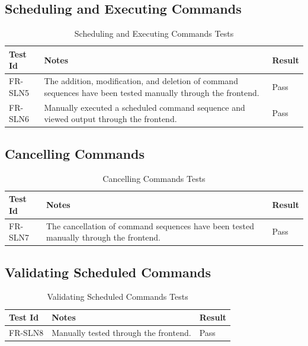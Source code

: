 \documentclass[12pt, titlepage]{article}
\begin{document}
\subsection{Scheduling and Executing Commands}

\begin{center}
\begin{longtable}{|p{2cm} | p{8cm} |p{2cm}| }
\caption{Scheduling and Executing Commands Tests}
\hline
\textbf{Test Id} & \textbf{Notes} & \textbf{Result} \\
\hline
FR-SLN5 & The addition, modification, and deletion of command sequences have been tested manually through the frontend. & Pass \\
\hline
FR-SLN6 & Manually executed a scheduled command sequence and viewed output through the frontend. & Pass \\
\hline

\end{longtable}
\end{center}

\subsection{Cancelling Commands}

\begin{center}
\begin{longtable}{|p{2cm} | p{8cm} |p{2cm}| }
\caption{Cancelling Commands Tests}
\hline
\textbf{Test Id} & \textbf{Notes} & \textbf{Result} \\
\hline
FR-SLN7 & The cancellation of command sequences have been tested manually through the frontend. & Pass \\
\hline

\end{longtable}
\end{center}

\subsection{Validating Scheduled Commands}

\begin{center}
\begin{longtable}{|p{2cm} | p{8cm} |p{2cm}| }
\caption{Validating Scheduled Commands Tests}
\hline
\textbf{Test Id} & \textbf{Notes} & \textbf{Result} \\
\hline
FR-SLN8 & Manually tested through the frontend. & Pass \\
\hline

\end{longtable}
\end{center}
\end{document}
